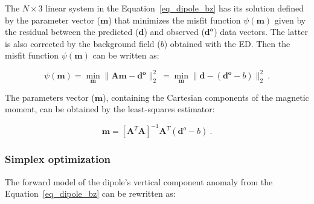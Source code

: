 
    The $N \times 3$ linear system in the Equation~\ref{eq_dipole_bz} has its solution defined by the parameter vector ($\mathbf{m}$) that minimizes the misfit function $\psi(\mathbf{m})$ given by the residual between the predicted ($\mathbf{\mathbf{d}}$) and observed ($\mathbf{\mathbf{d}^o}$) data vectors. The latter is also  corrected by the background field ($b$) obtained with the ED. Then the misfit function $\psi(\mathbf{m})$ can be written as:
   
    \begin{equation}
    \label{psi_function}
    \psi(\mathbf{m}) = \min_{\mathbf{m}} \| \mathbf{A}\mathbf{m} - \mathbf{\mathbf{d}^o} \|_2^2\ = \min_{\mathbf{m}} \| \mathbf{d} - (\mathbf{\mathbf{d}^o}-b) \|_2^2\
    .
    \end{equation}

    The parameters vector ($\mathbf{m}$), containing the Cartesian components of the magnetic moment, can be obtained by the least-squares estimator:

    \begin{equation}
    \label{dipole_moment_solution}
    \mathbf{m} = {[\mathbf{A}^T \mathbf{A}]}^{-1} \mathbf{A}^T (\mathbf{d}^o - b)\ .
    \end{equation}
        
\subsubsection{Simplex optimization} 
     The forward model of the dipole's vertical component anomaly from the Equation~\ref{eq_dipole_bz} can be rewritten as:
    
